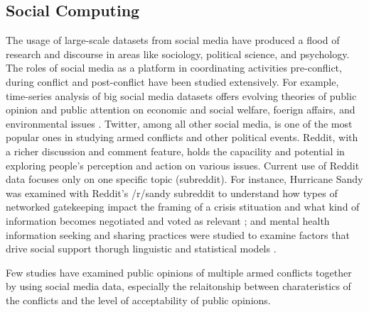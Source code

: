 \subsection{Social Computing}
The usage of large-scale datasets from social media have produced a flood of research and discourse in areas like sociology, political science, and psychology. The roles of social media as a platform in coordinating activities pre-conflict, during conflict and post-conflict have been studied extensively. For example, time-series analysis of big social media datasets offers evolving theories of public opinion and public attention on economic and social welfare, foerign affairs, and environmental issues \cite{RussellNeuman2014}. Twitter, among all other social media, is one of the most popular ones in studying armed conflicts and other political events. Reddit, with a richer discussion and comment feature, holds the capacility and potential in exploring people's perception and action on various issues. Current use of Reddit data focuses only on one specific topic (subreddit). For instance, Hurricane Sandy was examined with Reddit's /r/sandy subreddit to understand how types of networked gatekeeping impact the framing of a crisis stituation and what kind of information becomes negotiated and voted as relevant \cite{Leavitt}; and mental health information seeking and sharing practices were studied to examine factors that drive social support thorugh linguistic and statistical models \cite{dechoudhury2014mental}.

Few studies have examined public opinions of multiple armed conflicts together by using social media data, especially the relaitonship between charateristics of the conflicts and the level of acceptability of public opinions.
